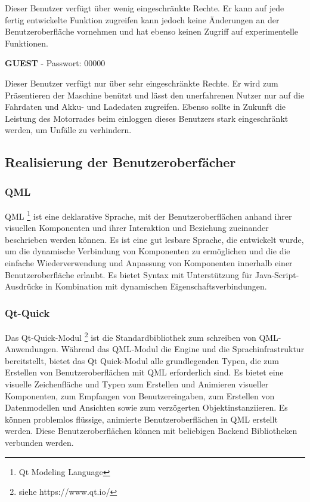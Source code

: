 Dieser Benutzer verfügt über wenig eingeschränkte Rechte. Er kann auf jede fertig entwickelte Funktion zugreifen kann jedoch keine Änderungen an der Benutzeroberfläche vornehmen und hat ebenso keinen Zugriff auf experimentelle Funktionen.

{\small \textbf{GUEST}} - Passwort: 00000\\ \vspace{2mm}

Dieser Benutzer verfügt nur über sehr eingeschränkte Rechte. Er wird zum Präsentieren der Maschine benützt und lässt den unerfahrenen Nutzer nur auf die Fahrdaten und Akku- und Ladedaten zugreifen. Ebenso sollte in Zukunft die Leistung des Motorrades beim einloggen dieses Benutzers stark eingeschränkt werden, um Unfälle zu verhindern.

\newpage

\subsection{Realisierung der Benutzeroberfächer}

\subsubsection{QML} \label{sec:qml}
QML \footnote{Qt Modeling Language} ist eine deklarative Sprache, mit der Benutzeroberflächen anhand ihrer visuellen Komponenten und ihrer Interaktion und Beziehung zueinander beschrieben werden können. Es ist eine gut lesbare Sprache, die entwickelt wurde, um die dynamische Verbindung von Komponenten zu ermöglichen und die die einfache Wiederverwendung und Anpassung von Komponenten innerhalb einer Benutzeroberfläche erlaubt. Es bietet  Syntax mit Unterstützung für Java-Script-Ausdrücke in Kombination mit dynamischen Eigenschaftsverbindungen.

\subsubsection{Qt-Quick}
Das Qt-Quick-Modul \footnote{siehe https://www.qt.io/} ist die Standardbibliothek zum schreiben von QML-Anwendungen. Während das QML-Modul die Engine und die Sprachinfrastruktur bereitstellt, bietet das Qt Quick-Modul alle grundlegenden Typen, die zum Erstellen von Benutzeroberflächen mit QML erforderlich sind. Es bietet eine visuelle Zeichenfläche und Typen zum Erstellen und Animieren visueller Komponenten, zum Empfangen von Benutzereingaben, zum Erstellen von Datenmodellen und Ansichten sowie zum verzögerten Objektinstanziieren. Es können problemlos flüssige, animierte Benutzeroberflächen in QML erstellt werden. Diese Benutzeroberflächen können mit beliebigen Backend Bibliotheken verbunden werden.

